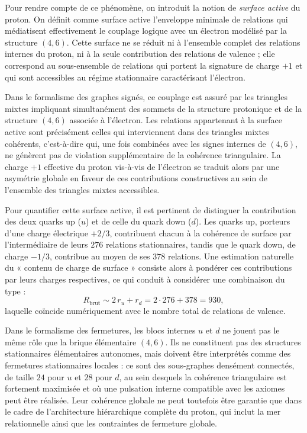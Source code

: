 \documentclass[11pt,a4paper]{article}
\begin{document}
Pour rendre compte de ce phénomène, on introduit la notion de \emph{surface active} du proton. On définit comme surface active l’enveloppe minimale de relations qui médiatisent effectivement le couplage logique avec un électron modélisé par la structure \(\left(4,6\right)\). Cette surface ne se réduit ni à l’ensemble complet des relations internes du proton, ni à la seule contribution des relations de valence ; elle correspond au sous-ensemble de relations qui portent la signature de charge \(+1\) et qui sont accessibles au régime stationnaire caractérisant l’électron.

Dans le formalisme des graphes signés, ce couplage est assuré par les triangles mixtes impliquant simultanément des sommets de la structure protonique et de la structure \(\left(4,6\right)\) associée à l’électron. Les relations appartenant à la surface active sont précisément celles qui interviennent dans des triangles mixtes cohérents, c’est-à-dire qui, une fois combinées avec les signes internes de \(\left(4,6\right)\), ne génèrent pas de violation supplémentaire de la cohérence triangulaire. La charge \(+1\) effective du proton vis-à-vis de l’électron se traduit alors par une asymétrie globale en faveur de ces contributions constructives au sein de l’ensemble des triangles mixtes accessibles.

Pour quantifier cette surface active, il est pertinent de distinguer la contribution des deux quarks up (\(u\)) et de celle du quark down (\(d\)). Les quarks up, porteurs d’une charge électrique \(+2/3\), contribuent chacun à la cohérence de surface par l’intermédiaire de leurs \(276\) relations stationnaires, tandis que le quark down, de charge \(-1/3\), contribue au moyen de ses \(378\) relations. Une estimation naturelle du « contenu de charge de surface » consiste alors à pondérer ces contributions par leurs charges respectives, ce qui conduit à considérer une combinaison du type :
\[
R_{\mathrm{brut}} \sim 2\, r_u + r_d
= 2\cdot 276 + 378
= 930,
\]
laquelle coïncide numériquement avec le nombre total de relations de valence.

Dans le formalisme des fermetures, les blocs internes \(u\) et \(d\) ne jouent pas le même rôle que la brique élémentaire \(\left(4,6\right)\). Ils ne constituent pas des structures stationnaires élémentaires autonomes, mais doivent être interprétés comme des fermetures stationnaires locales : ce sont des sous-graphes densément connectés, de taille \(24\) pour \(u\) et \(28\) pour \(d\), au sein desquels la cohérence triangulaire est fortement maximisée et où une pulsation interne compatible avec les axiomes peut être réalisée. Leur cohérence globale ne peut toutefois être garantie que dans le cadre de l’architecture hiérarchique complète du proton, qui inclut la mer relationnelle ainsi que les contraintes de fermeture globale.
\end{document}

